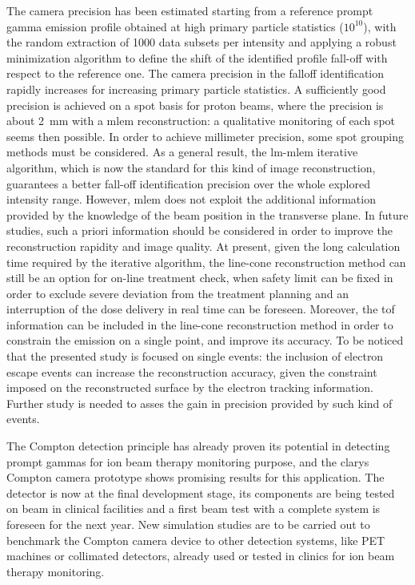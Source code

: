 The camera precision has been estimated starting from a reference prompt gamma emission profile obtained at high primary particle statistics ($10^{10}$), with the random extraction of 1000 data subsets per intensity and applying a robust minimization algorithm to define the shift of the identified profile fall-off with respect to the reference one.
The camera precision in the falloff identification rapidly increases for increasing primary particle statistics. A sufficiently good precision is achieved on a spot basis for proton beams, where the precision is about 2~mm with a \gls{mlem} reconstruction: a qualitative monitoring of each spot seems then possible. In order to achieve millimeter precision, some spot grouping methods must be considered. As a general result, the \gls{lm-mlem} iterative algorithm, which is now the standard for this kind of image reconstruction,  guarantees a better fall-off identification precision over the whole explored intensity range. However, \gls{mlem} does not exploit the additional information provided by the knowledge of the beam position in the transverse plane. In future studies, such a priori information should be considered in order to improve the reconstruction rapidity and image quality. At present, given the long calculation time required by the iterative algorithm, the line-cone reconstruction method can still be an option for on-line treatment check, when safety limit can be fixed in order to exclude severe deviation from the treatment planning and an interruption of the dose delivery in real time can be foreseen. Moreover, the \gls{tof} information can be included in the line-cone reconstruction method in order to constrain the emission on a single point, and improve its accuracy.
To be noticed that the presented study is focused on single events: the inclusion of electron escape events can increase the reconstruction accuracy, given the constraint imposed on the reconstructed surface by the electron tracking information. Further study is needed to asses the gain in precision provided by such kind of events. 

The Compton detection principle has already proven its potential in detecting prompt gammas for ion beam therapy monitoring purpose, and the \gls{clarys} Compton camera prototype shows promising results for this application. The detector is now at the final development stage, its components are being tested on beam in clinical facilities and a first beam test with a complete system is foreseen for the next year. New simulation studies are to be carried out to benchmark the Compton camera device to other detection systems, like PET machines or collimated detectors, already used or tested in clinics for ion beam therapy monitoring.            



\clearpage
